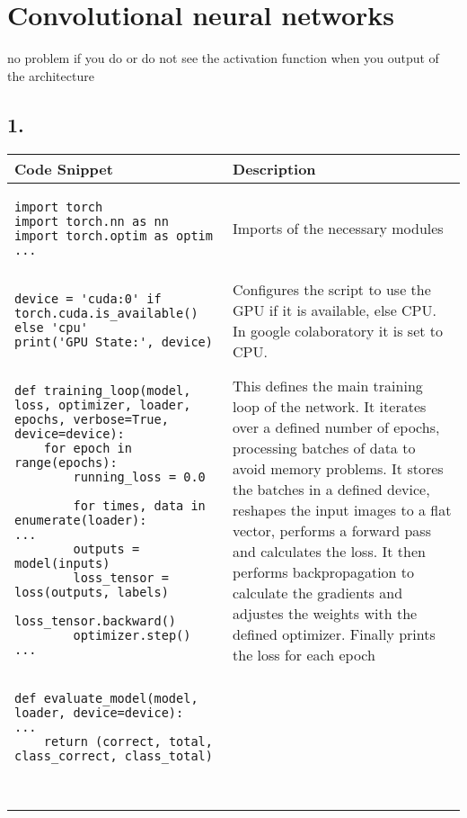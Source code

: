 \section{Convolutional neural networks}

no problem if you do or do not see the activation function when you output of the architecture 


\subsection*{1.}

\footnotesize
\begin{longtable}{|m{}|m{}|} \hline
\textbf{Code Snippet} & \textbf{Description} \\ \hline
\begin{lstlisting}
import torch
import torch.nn as nn
import torch.optim as optim
...
\end{lstlisting} & Imports of the necessary modules\\ \hline
\begin{lstlisting}
device = 'cuda:0' if torch.cuda.is_available() else 'cpu'
print('GPU State:', device)
\end{lstlisting} & Configures the script to use the GPU if it is available, else CPU. In google colaboratory it is set to CPU.\\ \hline

\begin{lstlisting}
def training_loop(model, loss, optimizer, loader, epochs, verbose=True, device=device):
    for epoch in range(epochs):
        running_loss = 0.0

        for times, data in enumerate(loader):
...
        outputs = model(inputs)
        loss_tensor = loss(outputs, labels)
        loss_tensor.backward()
        optimizer.step()
...
\end{lstlisting} & This defines the main training loop of the network. It iterates over a defined number of epochs, processing batches of data to avoid memory problems. It stores the batches in a defined device, reshapes the input images to a flat vector, performs a forward pass and calculates the loss. It then performs backpropagation to calculate the gradients and adjustes the weights with the defined optimizer. Finally prints the loss for each epoch\\ \hline

\begin{lstlisting}
def evaluate_model(model, loader, device=device):
...
    return (correct, total, class_correct, class_total)



\end{lstlisting}
\end{longtable}
